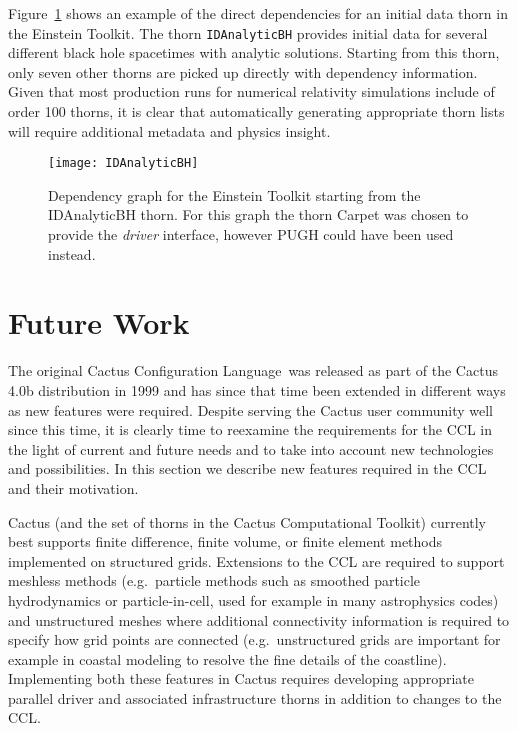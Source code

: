 \documentclass[conference]{IEEEtran}
\newcommand{\ccl}{Cactus Configuration Language}
\begin{document}
Figure~\ref{IDAnalyticBH} shows an example of the direct dependencies for an initial data thorn in the Einstein Toolkit. The thorn {\tt IDAnalyticBH} 
provides initial data for several different black hole spacetimes with analytic solutions. Starting from this thorn, only seven other thorns are picked up 
directly with dependency information. Given that most production runs for numerical relativity simulations include of order 100 thorns, it is clear that
automatically generating appropriate thorn lists will require additional metadata and physics insight.

\begin{figure}[h]
\centering
\texttt{[image: IDAnalyticBH]}
\label{IDAnalyticBH}
\caption{Dependency graph for the Einstein Toolkit starting from the IDAnalyticBH thorn. For this 
graph the thorn Carpet was chosen to provide the \emph{driver} interface, however PUGH could 
have been used instead.}
\end{figure}


\section{Future Work}
\label{futurework}
The original \ccl\ was released as part of the Cactus 4.0b distribution in 1999 and has since that time been  extended in different ways as new features were required. 
Despite serving the Cactus user community well since this time, it is clearly time to reexamine the requirements for the CCL in the 
light of current and future needs and to take into account new technologies and possibilities. 
 In this section we describe new features required in the CCL and their motivation. 
 
 Cactus (and the set of thorns in the Cactus Computational Toolkit) 
currently best supports finite difference, finite volume, or finite element methods implemented on structured grids. Extensions to the CCL 
are required to support meshless methods (e.g.\ particle methods such as smoothed particle hydrodynamics or particle-in-cell, used for 
example in many astrophysics codes) and unstructured meshes where additional connectivity information is required to specify how 
grid points are connected (e.g.\ unstructured grids are important for example in coastal modeling to resolve the fine details of the coastline). 
Implementing both these features in Cactus requires developing appropriate parallel driver and associated infrastructure thorns 
in addition to changes to the CCL\@. 
 
\end{document}
